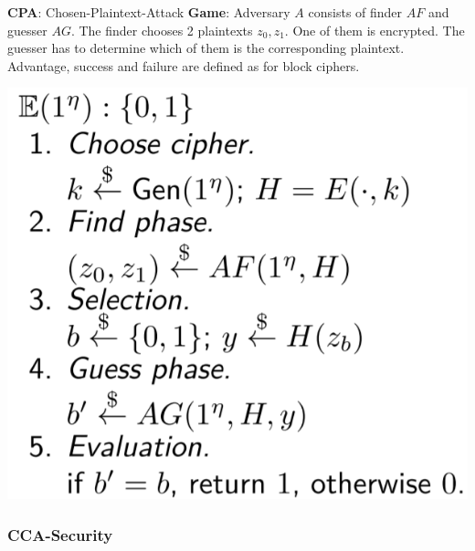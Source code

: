 \begin{minipage}{.62\linewidth}

\textbf{CPA}: Chosen-Plaintext-Attack \newline\newline \textbf{Game}:
Adversary \(A\) consists of finder \(AF\) and guesser \(AG\). The finder
chooses 2 plaintexts \(z_0, z_1\). One of them is encrypted. The guesser
has to determine which of them is the corresponding plaintext.
\newline\newline Advantage, success and failure are defined as for block
ciphers.

\end{minipage}\hfill
\begin{minipage}{.35\linewidth}
    \includegraphics[width=\linewidth]{img/cpa}
\end{minipage}

\hypertarget{cca-security}{%
\subsubsection{CCA-Security}\label{cca-security}}

